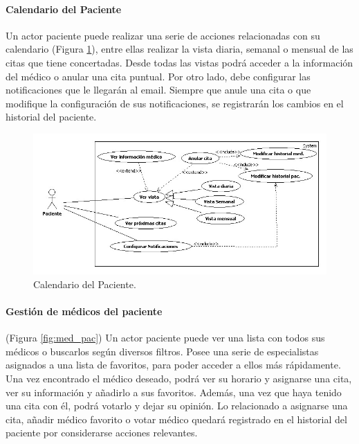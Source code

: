 				\paragraph{Calendario del Paciente} %
				\label{par:calendario_del_paciente}
					Un actor paciente puede realizar una serie de acciones relacionadas con su calendario (Figura \ref{fig:cal_pac}), entre ellas realizar la vista diaria, semanal o mensual de las citas que tiene concertadas. Desde todas las vistas podrá acceder a la información del médico o anular una cita puntual. Por otro lado, debe configurar las notificaciones que le llegarán al email. Siempre que anule una cita o que modifique la configuración de sus notificaciones, se registrarán los cambios en el historial del paciente.
					\begin{figure}[H]
					  \centering
					    \includegraphics[width=14cm]{img/jpg/casos_uso/Calendario_del_paciente.jpg}
					  \caption{Calendario del Paciente.}
					  \label{fig:cal_pac}
					\end{figure}

				\paragraph{Gestión de médicos del paciente} %
				\label{par:gestion_de_medicos_del_paciente}

					(Figura \ref{fig:med_pac}) Un actor paciente puede ver una lista con todos sus médicos o buscarlos según diversos filtros. Posee una serie de especialistas asignados a una lista de favoritos, para poder acceder a ellos más rápidamente. Una vez encontrado el médico deseado, podrá ver su horario y asignarse una cita, ver su información y añadirlo a sus favoritos. Además, una vez que haya tenido una cita con él, podrá votarlo y dejar su opinión. Lo relacionado a asignarse una cita, añadir médico favorito o votar médico quedará registrado en el historial del paciente por considerarse acciones relevantes.

